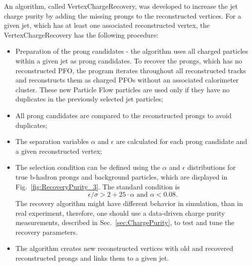 An algorithm, called VertexChargeRecovery, was developed to increase the jet charge purity by adding the missing prongs to the reconstructed vertices.  For a given jet, which has at least one associated reconstructed vertex, the VertexChargeRecovery has the following procedure:

\begin{itemize}
\item Preparation of the prong candidates - the algorithm uses all charged particles within a given jet as prong candidates. To recover the prongs, which has no reconstructed PFO, the program iterates throughout all reconstructed tracks and reconstructs them as charged PFOs without an associated calorimeter cluster. These new Particle Flow particles are used only if they have no duplicates in the previously selected jet particles;
\item All prong candidates are compared to the reconstructed prongs to avoid duplicates;
\item The separation variables $\alpha$ and $\epsilon$ are calculated for each prong candidate and a given reconstructed vertex;
\item The selection condition can be defined using the $\alpha$ and $\epsilon$ distributions for true b-hadron prongs and background particles, which are displayed in Fig.~\ref{fig:RecoveryPurity_3}. The standard condition is
\begin{equation}
\epsilon/\sigma > 2 + 25\cdot\alpha\text{ and } \alpha < 0.08.
\end{equation}
The recovery algorithm might have different behavior in simulation, than in real experiment, therefore, one should use a data-driven charge purity measurements, described in Sec.~\ref{sec:ChargePurity}, to test and tune the recovery parameters.
\item The algorithm creates new reconstructed vertices with old and recovered reconstructed prongs and links them to a given jet.
\end{itemize}

